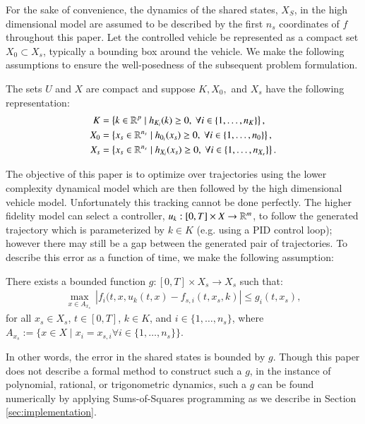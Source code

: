 For the sake of convenience, the dynamics of the shared states, $X_S$, in the high dimensional model are assumed to be described by the first $n_s$ coordinates of $f$ throughout this paper. 
Let the controlled vehicle be represented as a compact set $X_0 \subset X_s$, typically a bounding box around the vehicle.
We make the following assumptions to ensure the well-posedness of the subsequent problem formulation. 
\begin{assum} \label{ass:set}
The sets $U$ and $X$ are compact and suppose $K,X_0,$ and $X_s$ have the following representation:
\begin{align}
K &= \left\{ k \in \mathbb{R}^p \mid h_{K_i}(k) \geq 0, ~ \forall i \in \{ 1,\ldots, n_K\} \right\}, \label{eq:ass_2_1}\\
X_0 &= \left\{ x_s \in \mathbb{R}^{n_s} \mid h_{0_i}(x_s) \geq 0, ~ \forall i \in \{ 1,\ldots, n_0\} \right\},  \label{eq:ass_2_2} \\
X_s &= \left\{ x_s \in \mathbb{R}^{n_s} \mid h_{X_i}(x_s) \geq 0, ~ \forall i \in \{ 1,\ldots, n_{X_s}\} \right\}. \label{eq:ass_2_3}
\end{align}
\end{assum}

The objective of this paper is to optimize over trajectories using the lower complexity dynamical model which are then followed by the high dimensional vehicle model. 
Unfortunately this tracking cannot be done perfectly. 
The higher fidelity model can select a controller, $u_k: [0,T] \times X \to \mathbb{R}^m$, to follow the generated trajectory which is parameterized by $k \in K$ (e.g. using a PID control loop); however there may still be a gap between the generated pair of trajectories.
To describe this error as a function of time, we make the following assumption:
\begin{assum}\label{ass:error_func}
There exists a bounded function $g: [0,T] \times X_s \to X_s $ such that:
\begin{align}\label{eq:error_func}
\max_{x \in A_{x_s}} \, \left|f_i(t,x,u_k(t,x) - f_{s,i}(t,x_s,k)\right| \leq g_i(t,x_s),
\end{align}
for all $x_s \in X_s$, $t \in [0,T]$, $k \in K$, and $i \in \{1,\ldots,n_s \}$, where $A_{x_s} := \{ x \in X \mid x_i = x_{s,i} \forall i \in \{1,\ldots,n_s \} \}$.
\end{assum}
In other words, the error in the shared states is bounded by $g$.
Though this paper does not describe a formal method to construct such a $g$, in the instance of polynomial, rational, or trigonometric dynamics, such a $g$ can be found numerically by applying Sums-of-Squares programming as we describe in Section \ref{sec:implementation}. 

